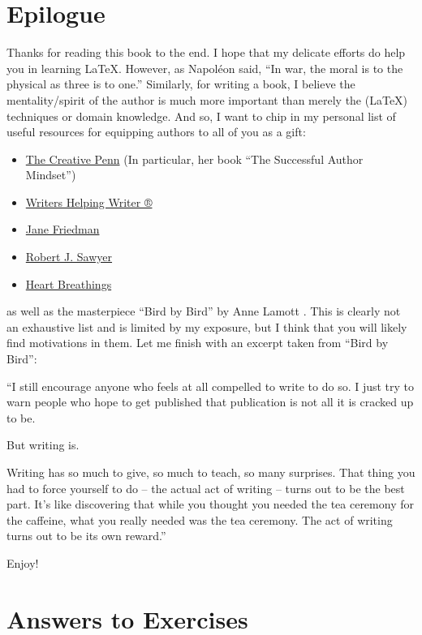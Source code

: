 \pagestyle{scrheadings}
\chapter*{Epilogue}

Thanks for reading this book to the end. I hope that my delicate efforts do help you in learning \LaTeX{}. However, as Napoléon said, “In war, the moral is to the physical as three is to one.” Similarly, for writing a book, I believe the mentality/spirit of the author is much more important than merely the (\LaTeX{}) techniques or domain knowledge. And so, I want to chip in my personal list of useful resources for equipping authors to all of you as a gift:
\begin{itemize}
    \item \href{https://www.thecreativepenn.com/}{The Creative Penn} (In particular, her book “The Successful Author Mindset”)
    \item \href{https://writershelpingwriters.net/}{Writers Helping Writer ®}
    \item \href{https://janefriedman.com/}{Jane Friedman}
    \item \href{https://www.sfwriter.com/}{Robert J. Sawyer}
    \item \href{https://www.youtube.com/@HeartBreathings}{Heart Breathings}
\end{itemize}
as well as the masterpiece “Bird by Bird” by Anne Lamott \cite{lamott1995bird}. This is clearly not an exhaustive list and is limited by my exposure, but I think that you will likely find motivations in them. Let me finish with an excerpt taken from “Bird by Bird”:

“I still encourage anyone who feels at all compelled to write to do so. I just try to warn people who hope to get published that publication is not all it is cracked up to be. 

But writing is.

Writing has so much to give, so much to teach, so many surprises. That thing you had to force yourself to do -- the actual act of writing -- turns out to be the best part. It’s like discovering that while you thought you needed the tea ceremony for the caffeine, what you really needed was the tea ceremony. The act of writing turns out to be its own reward.”

Enjoy!

\cleardoublepage
{}
\small
\printindex
\normalsize
\chapter*{Answers to Exercises}
\shipoutAnswer
\cleardoublepage
{}
\printbibliography[heading=bibintoc]